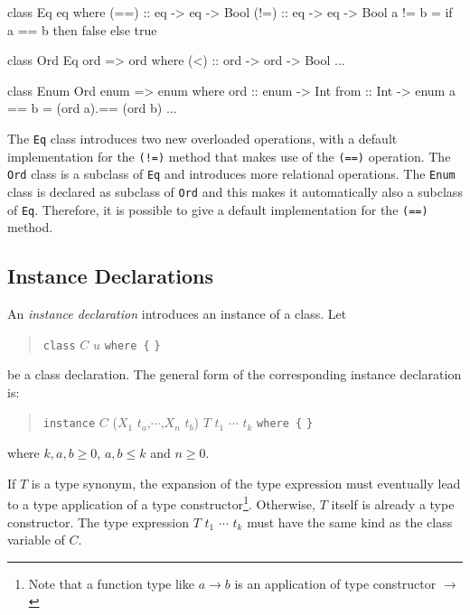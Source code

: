 \label{classexample}
\begin{code}
class Eq eq where
    (==) :: eq -> eq -> Bool
    (!=) :: eq -> eq -> Bool
    a != b  =  if a == b then false else true

class Ord Eq ord => ord where
    (<)  :: ord -> ord -> Bool
    ...

class Enum Ord enum => enum where
    ord   :: enum -> Int
    from :: Int -> enum
    a == b  =  (ord a).== (ord b)
    ...
\end{code}

The \texttt{Eq} class introduces two new overloaded operations, with a default implementation for the \texttt{(!=)} method that makes use of the \texttt{(==)} operation. The \texttt{Ord} class is a subclass of \texttt{Eq} and introduces more relational operations. The \texttt{Enum} class is declared as subclass of \texttt{Ord} and this makes it automatically also a subclass of \texttt{Eq}. Therefore, it is possible to give a default implementation for the \texttt{(==)} method. 

\subsection{Instance Declarations} \label{instdcl}  

\begin{flushleft}
      
\end{flushleft}

An \emph{instance declaration} introduces an instance of a class. Let
\begin{quote}
\texttt{class} $C$ $u$ \texttt{where \{}  \texttt{\}}
\end{quote}
be a class declaration.
The general form of the corresponding instance declaration is:
\begin{quote}
\texttt{instance} $C$ ($X_1$ $t_a$,$\cdots$,$X_n$ $t_b$) \sym{=>} $T$ $t_1$ $\cdots$ $t_k$ \texttt{where \{}  \texttt{\}}
\end{quote}
where $k,a,b \ge 0$, $a,b \le k$ and $n \ge 0$. 

If $T$ is a type synonym, the expansion of the type expression must eventually lead to a type application of a type constructor\footnote{Note that a function type like $a \rightarrow{} b$ is an application of type constructor
\sym{(}$\rightarrow{}$\sym{)}}. Otherwise, $T$ itself is already a type constructor. The type expression $T$ $t_1$ $\cdots$ $t_k$ must have the same kind as the class variable of $C$.

